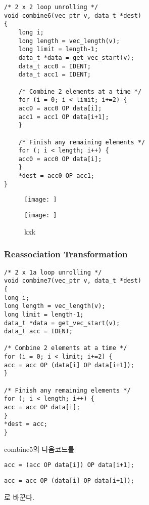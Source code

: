 \begin{lstlisting}[style = CStyle]
/* 2 x 2 loop unrolling */
void combine6(vec_ptr v, data_t *dest)
{
    long i;
    long length = vec_length(v);
    long limit = length-1;
    data_t *data = get_vec_start(v);
    data_t acc0 = IDENT;
    data_t acc1 = IDENT;

    /* Combine 2 elements at a time */
    for (i = 0; i < limit; i+=2) {
    acc0 = acc0 OP data[i];
    acc1 = acc1 OP data[i+1];
    }

    /* Finish any remaining elements */
    for (; i < length; i++) {
    acc0 = acc0 OP data[i];
    }
    *dest = acc0 OP acc1;
}
\end{lstlisting}

\begin{figure}[h!]
    \centering
    \texttt{[image: ]}
    \caption{}
\end{figure}



\begin{figure}[h!]
    \centering
    \texttt{[image: ]}
    \caption{kxk}
\end{figure}


\subsubsection{Reassociation Transformation}


\begin{lstlisting}[style = CStyle]
/* 2 x 1a loop unrolling */
void combine7(vec_ptr v, data_t *dest)
{
long i;
long length = vec_length(v);
long limit = length-1;
data_t *data = get_vec_start(v);
data_t acc = IDENT;

/* Combine 2 elements at a time */
for (i = 0; i < limit; i+=2) {
acc = acc OP (data[i] OP data[i+1]);
}

/* Finish any remaining elements */
for (; i < length; i++) {
acc = acc OP data[i];
}
*dest = acc;
}
\end{lstlisting}

combine5의 다음코드를


\begin{lstlisting}[style = CStyle]
    acc = (acc OP data[i]) OP data[i+1];
\end{lstlisting}


\begin{lstlisting}[style = CStyle]
    acc = acc OP (data[i] OP data[i+1]);
\end{lstlisting}
로 바꾼다.


